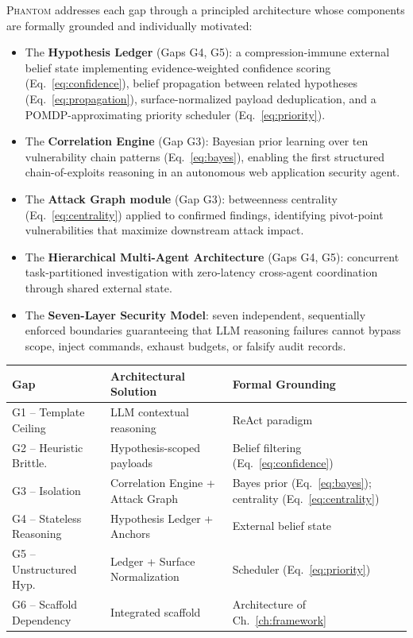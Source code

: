 \documentclass[12pt,a4paper,oneside,openany]{book}
\newcommand{\Phantom}{\textsc{Phantom}}
\begin{document}
\Phantom{} addresses each gap through a principled architecture whose components are formally grounded and individually motivated:

\begin{itemize}
\item The \textbf{Hypothesis Ledger} (Gaps G4, G5): a compression-immune external belief state implementing evidence-weighted confidence scoring (Eq.~\ref{eq:confidence}), belief propagation between related hypotheses (Eq.~\ref{eq:propagation}), surface-normalized payload deduplication, and a POMDP-approximating priority scheduler (Eq.~\ref{eq:priority}).
\item The \textbf{Correlation Engine} (Gap G3): Bayesian prior learning over ten vulnerability chain patterns (Eq.~\ref{eq:bayes}), enabling the first structured chain-of-exploits reasoning in an autonomous web application security agent.
\item The \textbf{Attack Graph module} (Gap G3): betweenness centrality (Eq.~\ref{eq:centrality}) applied to confirmed findings, identifying pivot-point vulnerabilities that maximize downstream attack impact.
\item The \textbf{Hierarchical Multi-Agent Architecture} (Gaps G4, G5): concurrent task-partitioned investigation with zero-latency cross-agent coordination through shared external state.
\item The \textbf{Seven-Layer Security Model}: seven independent, sequentially enforced boundaries guaranteeing that LLM reasoning failures cannot bypass scope, inject commands, exhaust budgets, or falsify audit records.
\end{itemize}

\begin{researchbox}
\begin{center}
\begin{tabular}{p{3.5cm}p{4.5cm}p{4.5cm}}
\toprule
\textbf{Gap} & \textbf{Architectural Solution} & \textbf{Formal Grounding} \\
\midrule
G1 -- Template Ceiling    & LLM contextual reasoning        & ReAct paradigm \cite{yao2022react} \\
G2 -- Heuristic Brittle.  & Hypothesis-scoped payloads      & Belief filtering (Eq.~\ref{eq:confidence}) \\
G3 -- Isolation           & Correlation Engine + Attack Graph & Bayes prior (Eq.~\ref{eq:bayes}); centrality (Eq.~\ref{eq:centrality}) \\
G4 -- Stateless Reasoning & Hypothesis Ledger + Anchors     & External belief state \\
G5 -- Unstructured Hyp.  & Ledger + Surface Normalization  & Scheduler (Eq.~\ref{eq:priority}) \\
G6 -- Scaffold Dependency & Integrated scaffold             & Architecture of Ch.~\ref{ch:framework} \\
\bottomrule
\end{tabular}
\end{center}
\end{researchbox}
\end{document}
